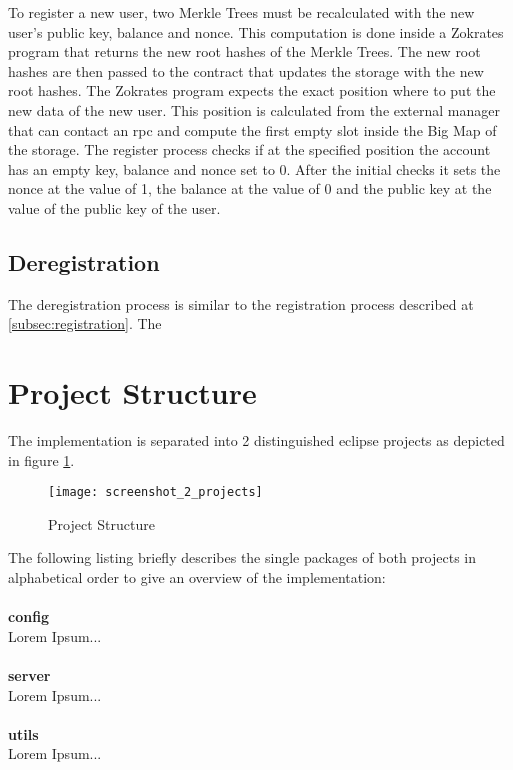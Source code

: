 To register a new user, two Merkle Trees must be recalculated with the new user's public key, balance and nonce. This computation is done inside a Zokrates program that returns the new root hashes of the Merkle Trees. The new root hashes are then passed to the contract that updates the storage with the new root hashes. The Zokrates program expects the exact position where to put the new data of the new user. This position is calculated from the external manager that can contact an rpc and compute the first empty slot inside the Big Map of the storage. The register process checks if at the specified position the account has an empty key, balance and nonce set to 0. After the initial checks it sets the nonce at the value of 1, the balance at the value of 0 and the public key at the value of the public key of the user.

\subsection{Deregistration}

The deregistration process is similar to the registration process described at \ref{subsec:registration}. The 


\section{Project Structure\label{sec:projectstructure}}

The implementation is separated into 2 distinguished eclipse projects as depicted in figure \ref{fig:projects}.

\begin{figure}[htb]
  \centering
  \texttt{[image: screenshot\_2\_projects]}
  \caption{Project Structure}
  \label{fig:projects}
\end{figure}

\noindent
The following listing briefly describes the single packages of both projects in alphabetical order to give an overview of the implementation:
\\
\\
\textbf{config} 
\\
Lorem Ipsum...
\\
\\
\textbf{server} 
\\
Lorem Ipsum...
\\
\\
\textbf{utils} 
\\
Lorem Ipsum...

